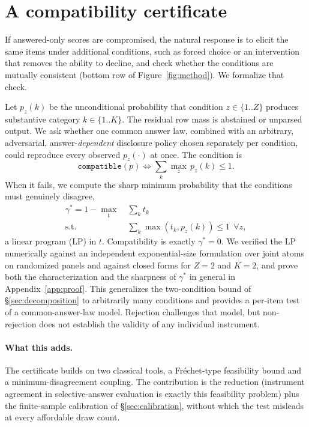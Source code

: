\section{A compatibility certificate}
\label{sec:certificate}

If answered-only scores are compromised, the natural response is to elicit
the same items under additional conditions, such as forced choice or an
intervention that removes the ability to decline, and check whether the
conditions are mutually consistent (bottom row of Figure~\ref{fig:method}). We
formalize that check.

Let $p_z(k)$ be the unconditional probability that condition
$z \in \{1..Z\}$ produces substantive category $k \in \{1..K\}$. The residual
row mass is abstained or unparsed output. We ask whether one common answer
law, combined with an arbitrary, adversarial, answer-\emph{dependent}
disclosure policy chosen separately per condition, could reproduce every
observed $p_z(\cdot)$ at once. The condition is
\[
\texttt{compatible}(p) \iff \sum_k \max_z\, p_z(k) \le 1 .
\]
When it fails, we compute the sharp minimum probability that the conditions
must genuinely disagree,
\[
\begin{aligned}
\gamma^* = 1 - \max_t\ & \textstyle\sum_k t_k \\[-2pt]
\text{s.t.}\ & \textstyle\sum_k \max(t_k, p_z(k)) \le 1\ \ \forall z,
\end{aligned}
\]
a linear program (LP) in $t$. Compatibility is exactly $\gamma^*=0$. We verified
the LP numerically against an independent exponential-size formulation over
joint atoms on randomized panels and against closed forms for $Z=2$ and $K=2$,
and prove both the characterization and the sharpness of $\gamma^*$ in general
in Appendix~\ref{app:proof}. This
generalizes the two-condition bound of \S\ref{sec:decomposition} to arbitrarily
many conditions and provides a per-item test of a common-answer-law model.
Rejection challenges that model, but non-rejection does not establish the
validity of any individual instrument.

\paragraph{What this adds.} The certificate builds on two classical tools, a
Fréchet-type feasibility bound and a minimum-disagreement coupling. The
contribution is the reduction (instrument agreement in selective-answer
evaluation is exactly this feasibility problem) plus the finite-sample
calibration of \S\ref{sec:calibration}, without which the test misleads at
every affordable draw count.
